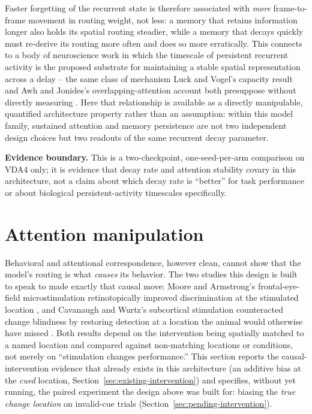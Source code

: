\documentclass[11pt,a4paper]{article}
\newcommand{\boundary}[1]{\par\smallskip\noindent\colorbox{VdaLight}{\parbox{0.96\linewidth}{\textbf{Evidence boundary.} #1}}\par\smallskip}
\begin{document}
Faster forgetting of the recurrent state is therefore associated with \emph{more} frame-to-frame movement in routing weight, not less: a memory that retains information longer also holds its spatial routing steadier, while a memory that decays quickly must re-derive its routing more often and does so more erratically. This connects to a body of neuroscience work in which the timescale of persistent recurrent activity is the proposed substrate for maintaining a stable spatial representation across a delay -- the same class of mechanism Luck and Vogel's capacity result and Awh and Jonides's overlapping-attention account both presuppose without directly measuring \citep{luck1997,awh2001}. Here that relationship is available as a directly manipulable, quantified architecture property rather than an assumption: within this model family, sustained attention and memory persistence are not two independent design choices but two readouts of the same recurrent decay parameter. \boundary{This is a two-checkpoint, one-seed-per-arm comparison on VDA4 only; it is evidence that decay rate and attention stability covary in this architecture, not a claim about which decay rate is ``better'' for task performance or about biological persistent-activity timescales specifically.}

\section{Attention manipulation}\label{sec:intervention}
Behavioral and attentional correspondence, however clean, cannot show that the model's routing is what \emph{causes} its behavior. The two studies this design is built to speak to made exactly that causal move: Moore and Armstrong's frontal-eye-field microstimulation retinotopically improved discrimination at the stimulated location \citep{moore2003}, and Cavanaugh and Wurtz's subcortical stimulation counteracted change blindness by restoring detection at a location the animal would otherwise have missed \citep{cavanaugh2004}. Both results depend on the intervention being spatially matched to a named location and compared against non-matching locations or conditions, not merely on ``stimulation changes performance.'' This section reports the causal-intervention evidence that already exists in this architecture (an additive bias at the \emph{cued} location, Section~\ref{sec:existing-intervention}) and specifies, without yet running, the paired experiment the design above was built for: biasing the \emph{true change location} on invalid-cue trials (Section~\ref{sec:pending-intervention}).
\end{document}
